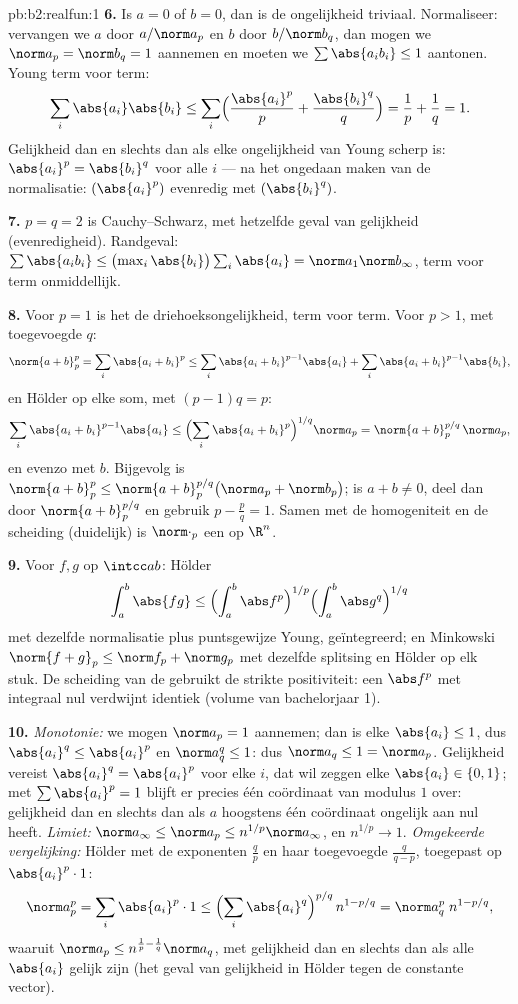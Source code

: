 \begin{solution}{pb:b2:realfun:1}
\textbf{6.} Is $a = 0$ of $b = 0$, dan is de ongelijkheid triviaal.
Normaliseer: vervangen we $a$ door $a/\norm a_p$ en $b$ door
$b/\norm b_q$, dan mogen we $\norm a_p = \norm b_q = 1$ aannemen en
moeten we $\sum\abs{a_ib_i} \leq 1$ aantonen. Young term voor
term:
\[
\sum_i\abs{a_i}\abs{b_i} \leq
\sum_i\Bigl(\frac{\abs{a_i}^p}{p} +
\frac{\abs{b_i}^q}{q}\Bigr) = \frac1p + \frac1q = 1 .
\]
Gelijkheid dan en slechts dan als elke ongelijkheid van Young
scherp is: $\abs{a_i}^p = \abs{b_i}^q$ voor alle $i$ --- na het
ongedaan maken van de normalisatie: $(\abs{a_i}^p)$ evenredig met
$(\abs{b_i}^q)$.

\textbf{7.} $p = q = 2$ is Cauchy--Schwarz, met hetzelfde geval van
gelijkheid (evenredigheid). Randgeval: $\sum\abs{a_ib_i} \leq
\bigl(\max_i\abs{b_i}\bigr)\sum_i\abs{a_i} = \norm a_1\norm
b_\infty$, term voor term onmiddellijk.

\textbf{8.} Voor $p = 1$ is het de driehoeksongelijkheid, term voor
term. Voor $p > 1$, met toegevoegde $q$:
\[
\norm{a+b}_p^p = \sum_i\abs{a_i + b_i}^p
\leq \sum_i\abs{a_i+b_i}^{p-1}\abs{a_i} +
\sum_i\abs{a_i+b_i}^{p-1}\abs{b_i},
\]
en Hölder op elke som, met $(p - 1)q = p$:
\[
\sum_i\abs{a_i+b_i}^{p-1}\abs{a_i} \leq
\Bigl(\sum_i\abs{a_i+b_i}^{p}\Bigr)^{1/q}\norm a_p
= \norm{a + b}_p^{p/q}\,\norm a_p ,
\]
en evenzo met $b$. Bijgevolg is $\norm{a+b}_p^p \leq \norm{a +
b}_p^{p/q}\bigl(\norm a_p + \norm b_p\bigr)$; is $a + b \neq 0$,
deel dan door $\norm{a+b}_p^{p/q}$ en gebruik $p - \frac pq = 1$.
Samen met de homogeniteit en de scheiding (duidelijk) is
$\norm\cdot_p$ een  op $\R^n$.

\textbf{9.} Voor  $f, g$ op $\intcc ab$: Hölder
\[
\int_a^b\abs{fg} \leq \Bigl(\int_a^b\abs
f^p\Bigr)^{1/p}\Bigl(\int_a^b\abs g^q\Bigr)^{1/q}
\]
met dezelfde normalisatie plus puntsgewijze Young, geïntegreerd; en
Minkowski $\norm{f + g}_p \leq \norm f_p + \norm g_p$ met dezelfde
splitsing en Hölder op elk stuk. De scheiding van de  gebruikt
de strikte positiviteit: een  $\abs f^p$ met integraal nul
verdwijnt identiek (volume van bachelorjaar 1).

\textbf{10.} \emph{Monotonie:} we mogen $\norm a_p = 1$ aannemen;
dan is elke $\abs{a_i} \leq 1$, dus $\abs{a_i}^q \leq
\abs{a_i}^p$ en $\norm a_q^q \leq 1$: dus $\norm a_q \leq 1 =
\norm a_p$. Gelijkheid vereist $\abs{a_i}^q = \abs{a_i}^p$ voor
elke $i$, dat wil zeggen elke $\abs{a_i} \in \{0, 1\}$; met
$\sum\abs{a_i}^p = 1$ blijft er precies één coördinaat van modulus
$1$ over: gelijkheid dan en slechts dan als $a$ hoogstens één
coördinaat ongelijk aan nul heeft. \emph{Limiet:} $\norm a_\infty
\leq \norm a_p \leq n^{1/p}\norm a_\infty$, en $n^{1/p} \to 1$.
\emph{Omgekeerde vergelijking:} Hölder met de exponenten $\frac
qp$ en haar toegevoegde $\frac{q}{q-p}$, toegepast op
$\abs{a_i}^p\cdot 1$:
\[
\norm a_p^p = \sum_i\abs{a_i}^p\cdot 1 \leq
\Bigl(\sum_i\abs{a_i}^{q}\Bigr)^{p/q}\,n^{1 - p/q}
= \norm a_q^{p}\; n^{1-p/q},
\]
waaruit $\norm a_p \leq n^{\frac1p - \frac1q}\norm a_q$, met
gelijkheid dan en slechts dan als alle $\abs{a_i}$ gelijk zijn (het
geval van gelijkheid in Hölder tegen de constante vector).


\end{solution}

